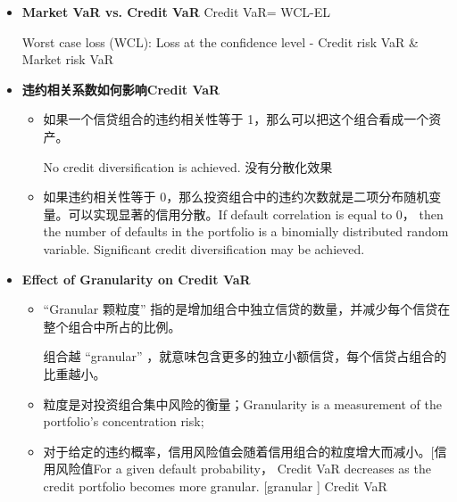 \begin{itemize}
\item \textbf{Market VaR vs. Credit VaR}
Credit VaR= WCL-EL 

Worst case loss (WCL): Loss at the confidence level - Credit risk VaR \& Market risk VaR

\begin{center}
\end{center}


\item \textbf{违约相关系数如何影响Credit VaR}
   \begin{itemize}
\item 如果一个信贷组合的违约相关性等于 1，那么可以把这个组合看成一个资产。
    
No credit diversification is achieved. 没有分散化效果

\item 如果违约相关性等于 0，那么投资组合中的违约次数就是二项分布随机变量。可以实现显著的信用分散。If default correlation is equal to 0， then the number of defaults in the portfolio is a binomially distributed random variable. Significant credit diversification may be achieved.
\end{itemize}


\item \textbf{Effect of Granularity on Credit VaR}
\begin{itemize}
 \item “Granular 颗粒度” 指的是增加组合中独立信贷的数量，并减少每个信贷在整个组合中所占的比例。

组合越 “granular” ，就意味包含更多的独立小额信贷，每个信贷占组合的比重越小。

\item 粒度是对投资组合集中风险的衡量；Granularity is a measurement of the portfolio's concentration risk;

\item 对于给定的违约概率，信用风险值会随着信用组合的粒度增大而减小。[信用风险值For a given default probability， Credit VaR decreases as the credit portfolio becomes more granular. [granular ] Credit VaR 


\end{itemize}
\end{itemize}
